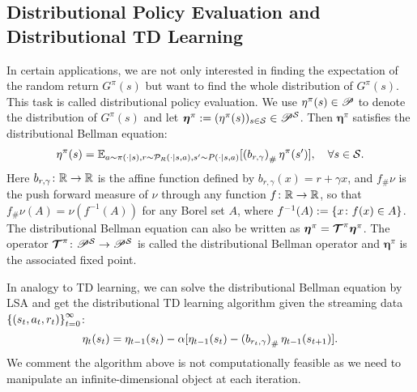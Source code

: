 \subsection{Distributional Policy Evaluation and Distributional TD Learning}
In certain applications, we are not only interested in finding the expectation of the random return $G^\pi(s)$ but want to find the whole distribution of $G^\pi(s)$.
This task is called distributional policy evaluation.
We use $\eta^\pi(s)\in{\mathscr{P}}$ to denote the distribution of $G^\pi(s)$ and let ${\bm{\eta}}^\pi:=(\eta^\pi(s))_{s\in{\mathcal{S}}}\in{\mathscr{P}}^{\mathcal{S}}$.
Then ${\bm{\eta}}^\pi$ satisfies the distributional Bellman equation:
\begin{equation}
\label{eq:distributional_Bellman_equation}
        \eta^\pi(s)={\mathbb E}_{a\sim\pi(\cdot\mid s),r\sim {\mathcal{P}}_R({\cdot}\mid s,a),s^\prime\sim P(\cdot\mid s,a)}[\left({b_{r,\gamma}}\right)_\#\eta^\pi(s^\prime)],\quad\forall s\in{\mathcal{S}}.
\end{equation}
Here $b_{r,\gamma}\colon {\mathbb R}\to{\mathbb R}$ is the affine function defined by $b_{r,\gamma}(x)=r+\gamma x$, and $f_\#\nu$ is the push forward measure of $\nu$ through any function $f\colon {\mathbb R}\to{\mathbb R}$, so that $f_\#\nu(A)=\nu(f^{-1}(A))$ for any Borel set $A$, where $f^{-1}(A):=\left\{{x\colon f(x)\in A}\right\}$.
The distributional Bellman equation can also be written as ${\bm{\eta}}^\pi={\bm{\bm{\mathcal{T}}}}^\pi{\bm{\eta}}^\pi$.
The operator ${{\bm{\mathcal{T}}}}^\pi\colon {\mathscr{P}}^{\mathcal{S}}\to {\mathscr{P}}^{\mathcal{S}}$ is called the distributional Bellman operator and ${\bm{\eta}}^\pi$ is the associated fixed point.

In analogy to TD learning, we can solve the distributional Bellman equation by LSA
and get the distributional TD learning algorithm given the streaming data  $\left\{{\left({s_t,a_t,r_t}\right)}\right\}_{t=0}^\infty$:
\begin{equation*}
    \eta_{t}(s_t)=\eta_{t-1}(s_{t})-\alpha[\eta_{t-1}(s_{t})-\left({b_{r_t,\gamma}}\right)_\#\eta_{t-1}(s_{t+1})].
\end{equation*}
We comment the algorithm above is not computationally feasible as we need to manipulate an infinite-dimensional object at each iteration.
 
